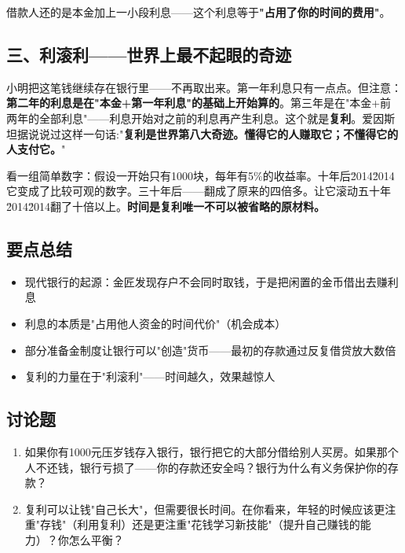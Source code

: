 \documentclass[a4paper,12pt]{ctexart}
\begin{document}
借款人还的是本金加上一小段利息——这个利息等于\textbf{"占用了你的时间的费用"}。

\subsection*{三、利滚利——世界上最不起眼的奇迹}

小明把这笔钱继续存在银行里——不再取出来。第一年利息只有一点点。但注意：\textbf{第二年的利息是在"本金+第一年利息"的基础上开始算的}。第三年是在"本金+前两年的全部利息"——利息开始对之前的利息再产生利息。这个就是\textbf{复利}。爱因斯坦据说说过这样一句话:"\textbf{复利是世界第八大奇迹。懂得它的人赚取它；不懂得它的人支付它。}"

看一组简单数字：假设一开始只有1000块，每年有5\%的收益率。十年后\u2014\u2014它变成了比较可观的数字。三十年后——翻成了原来的四倍多。让它滚动五十年\u2014\u2014翻了十倍以上。\textbf{时间是复利唯一不可以被省略的原材料。}

\subsection*{要点总结}
\begin{itemize}
  \item 现代银行的起源：金匠发现存户不会同时取钱，于是把闲置的金币借出去赚利息
  \item 利息的本质是"占用他人资金的时间代价"（机会成本）
  \item 部分准备金制度让银行可以"创造"货币——最初的存款通过反复借贷放大数倍
  \item 复利的力量在于"利滚利"——时间越久，效果越惊人
\end{itemize}

\subsection*{讨论题}
\begin{enumerate}
  \item 如果你有1000元压岁钱存入银行，银行把它的大部分借给别人买房。如果那个人不还钱，银行亏损了——你的存款还安全吗？银行为什么有义务保护你的存款？
  \item 复利可以让钱"自己长大"，但需要很长时间。在你看来，年轻的时候应该更注重"存钱"（利用复利）还是更注重"花钱学习新技能"（提升自己赚钱的能力）？你怎么平衡？
\end{enumerate}
\end{document}
